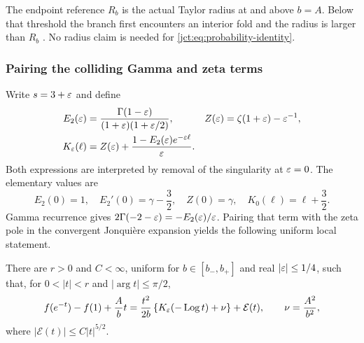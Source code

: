 The endpoint reference $R_b$ is the actual Taylor radius at and above
$b=A$. Below that threshold the branch first encounters an interior
fold and the radius is larger than $R_b$ \cite{qfb:reports}.
No radius claim is needed for \eqref{jct:eq:probability-identity}.

\subsubsection{Pairing the colliding Gamma and zeta terms}

Write $s=3+\varepsilon$ and define
\begin{align}
 E_2(\varepsilon)&=\frac{\Gamma(1-\varepsilon)}{(1+\varepsilon)(1+\varepsilon/2)},
 & Z(\varepsilon)&=\zeta(1+\varepsilon)-\varepsilon^{-1},\label{jct:eq:E-Z}\\
 K_\varepsilon(\ell)&=Z(\varepsilon)+
      \frac{1-E_2(\varepsilon)e^{-\varepsilon\ell}}{\varepsilon}.
      \label{jct:eq:K}
\end{align}
Both expressions are interpreted by removal of the singularity at
$\varepsilon=0$. The elementary values are
\begin{equation}\label{jct:eq:resonant-values}
 E_2(0)=1,\quad E_2'(0)=\gamma-\frac32,\quad
 Z(0)=\gamma,\quad K_0(\ell)=\ell+\frac32.
\end{equation}
Gamma recurrence gives
$2\Gamma(-2-\varepsilon)=-E_2(\varepsilon)/\varepsilon$. Pairing that term with the
zeta pole in the convergent Jonqui\`ere expansion yields the following
uniform local statement.

\begin{lemma}
\label{jct:lem:local}
There are $r>0$ and $C<\infty$, uniform for $b\in[b_-,b_+]$ and
real $|\varepsilon|\le1/4$, such that, for
$0<|t|<r$ and $|\arg t|\le\pi/2$,
\begin{equation}\label{jct:eq:local-exponent}
 f(e^{-t})-f(1)+\frac Ab t
 =\frac{t^2}{2b}\left\{K_\varepsilon(-\operatorname{Log} t)+\nu\right\}
   +\mathcal E(t),\qquad \nu=\frac{A^2}{b^2},
\end{equation}
where $|\mathcal E(t)|\le C|t|^{5/2}$.
\end{lemma}

